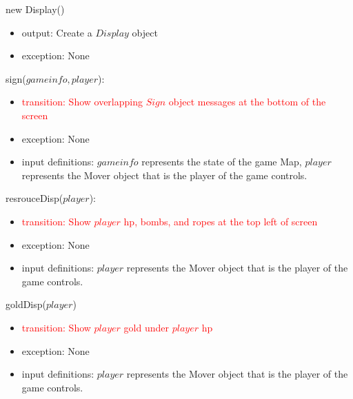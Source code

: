 \documentclass[12pt]{article}
\begin{document}
new Display()
\begin{itemize}
    \item output: Create a $Display$ object
    \item exception: None
\end{itemize}


\noindent sign($gameinfo, player$):
\begin{itemize}
    \item \textcolor{red}{transition: Show overlapping $Sign$ object messages at the bottom of the screen}
    \item exception: None
    \item input definitions: $gameinfo$ represents the state of the game Map, $player$ represents the Mover object that is the player of the game controls.
\end{itemize}

\noindent resrouceDisp($player$):
\begin{itemize}
    \item \textcolor{red}{transition: Show $player$ hp, bombs, and ropes at the top left of screen}
    \item exception: None
    \item input definitions: $player$ represents the Mover object that is the player of the game controls.
\end{itemize}

\noindent goldDisp($player$)
\begin{itemize}
    \item \textcolor{red}{transition: Show $player$ gold under $player$ hp}
    \item exception: None
    \item input definitions: $player$ represents the Mover object that is the player of the game controls.
\end{itemize}
\end{document}
